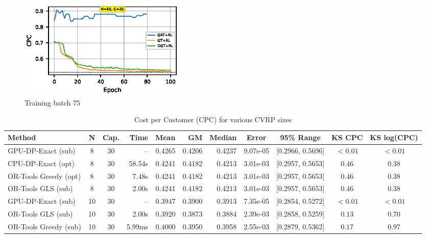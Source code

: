 \documentclass[a4paper,twoside]{article}
\begin{document}
\begin{figure}[t!]
\centering
   \includegraphics[width=80mm]{figures/tiny_n10.eps}
   \caption{Training batch 75}
\label{fig:training_batch}
\end{figure}



\begin{table}[htbp]
\centering
\caption{Cost per Customer (CPC) for various CVRP sizes}
\label{tab:benchmark-comparison}
\small
\begin{tabular}{@{}l c c r r r r c c c c@{}}
\toprule
\textbf{Method} & \textbf{N} & \textbf{Cap.} & \textbf{Time} & \textbf{Mean} & \textbf{GM} & \textbf{Median} & \textbf{Error} & \textbf{95\% Range} & \textbf{KS CPC} & \textbf{KS log(CPC)} \\
\midrule
GPU-DP-Exact (sub)   & 8  & 30 & -- & 0.4265 & 0.4206 & 0.4237 & 9.07e-05 & [0.2966, 0.5696] & $<0.01$ & $<0.01$ \\
CPU-DP-Exact (opt)    & 8 & 30 & 58.54s & 0.4241 & 0.4182 & 0.4213 & 3.01e-03 & [0.2957, 0.5653] & $0.46$ & $0.38$ \\
OR-Tools Greedy (opt) & 8 & 30 & 7.48s & 0.4241 & 0.4182 & 0.4213 & 3.01e-03 & [0.2957, 0.5653] & $0.46$ & $0.38$ \\
OR-Tools GLS (sub)    & 8 & 30 & 2.00s & 0.4241 & 0.4182 & 0.4213 & 3.01e-03 & [0.2957, 0.5653] & $0.46$ & $0.38$ \\
\midrule
GPU-DP-Exact (sub)   & 10 & 30 & --     & 0.3947 & 0.3900 & 0.3913 & 7.35e-05 & [0.2854, 0.5272] & $<0.01$ & $<0.01$ \\
OR-Tools GLS (sub)    & 10 & 30 & 2.00s  & 0.3920 & 0.3873 & 0.3884 & 2.39e-03 & [0.2858, 0.5259] & $0.13$ & $0.70$ \\
OR-Tools Greedy (sub) & 10 & 30 & 5.99ms & 0.4000 & 0.3950 & 0.3958 & 2.55e-03 & [0.2879, 0.5362] & $0.17$ & $0.97$ \\

\end{tabular}
\end{table}
\end{document}
